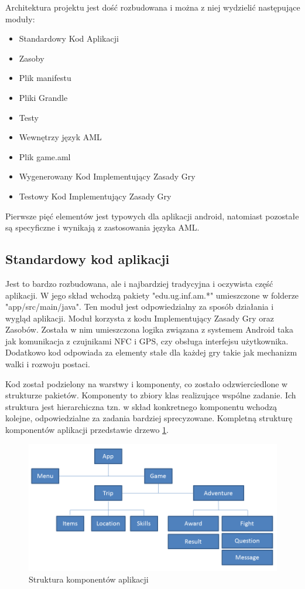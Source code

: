 \documentclass{xmgr}
\begin{document}
Architektura projektu jest dość rozbudowana i można z niej wydzielić następujące moduły:

\begin{itemize}
	\item Standardowy Kod Aplikacji
	\item Zasoby
	\item Plik manifestu
	\item Pliki Grandle
	\item Testy
	\item Wewnętrzy język AML
	\item Plik game.aml
	\item Wygenerowany Kod Implementujący Zasady Gry
	\item Testowy Kod Implementujący Zasady Gry
\end{itemize}

Pierwsze pięć elementów jest typowych dla aplikacji android, natomiast pozostałe są specyficzne i wynikają z zastosowania języka AML.

\subsection{Standardowy kod aplikacji} 

Jest to bardzo rozbudowana, ale i najbardziej tradycyjna i oczywista część aplikacji. W jego skład wchodzą pakiety "edu.ug.inf.am.*" umieszczone w folderze "app/src/main/java". Ten moduł jest odpowiedzialny za sposób działania i wygląd aplikacji. Moduł korzysta z kodu Implementujący Zasady Gry oraz Zasobów. Została w nim umieszczona logika związana z systemem Android taka jak komunikacja z czujnikami NFC i GPS, czy obsługa interfejsu użytkownika. Dodatkowo kod odpowiada za elementy stałe dla każdej gry takie jak mechanizm walki i rozwoju postaci.

Kod został podzielony na warstwy i komponenty, co zostało odzwierciedlone w strukturze pakietów. 
Komponenty to zbiory klas realizujące wspólne zadanie. Ich struktura jest hierarchiczna tzn. w skład konkretnego komponentu wchodzą kolejne, odpowiedzialne za zadania bardziej sprecyzowane. Kompletną strukturę komponentów aplikacji przedstawie drzewo \ref{modules:tree}.

\begin{figure}[!tbh]
	\centering
	\includegraphics[width=1.0\hsize]{fig/modules_tree}
	\caption{Struktura komponentów aplikacji}
	\label{modules:tree}
\end{figure}
\end{document}
